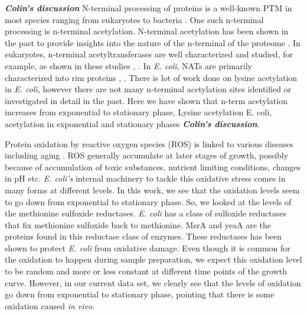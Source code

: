 \documentclass[12pt]{article}
\begin{document}
\textbf{\emph{Colin's discussion}} N-terminal processing of proteins is a well-known PTM in most species ranging from eukaryotes to bacteria \cite{Kimuraetal2003}. One such n-terminal processing is n-terminal acetylation. N-terminal acetylation has been shown in the past to provide insights into the nature of the n-terminal of the proteome \cite{Helbigetal2010}. In eukaryotes, n-terminal acetyltransferases are well characterized and studied, for example, as shown in these studies \cite{PolevodaSherman2003}, \cite{PolevodaSherman2003b}. In \emph{E. coli}, NATs are primarily characterized into rim proteins \cite{Tanakaetal1989}, \cite{Yoshikawaetal1987}. There is lot of work done on lysine acetylation in \emph{E. coli}, however there are not many n-terminal acetylation sites identified or investigated in detail in the past. Here we have shown that n-term acetylation increases from exponential to stationary phase, Lysine acetylation E. coli, acetylation in exponential and stationary phases \textbf{\emph{Colin's discussion}}. 

Protein oxidation by reactive oxygen species (ROS) is linked to various diseases including aging \cite{Stadtman1992}. ROS generally accumulate at later stages of growth, possibly because of accumulation of toxic substances, nutrient limiting conditions, changes in pH etc. \emph{E. coli's} internal machinery to tackle this oxidative stress comes in many forms at different levels. In this work, we see that the oxidation levels seem to go down from exponential to stationary phase. So, we looked at the levels of the methionine sulfoxide reductases. \emph{E. coli} has a class of sulfoxide reductases \cite{Brotetal1981} \cite{ZhangWeissbach2008} that fix methionine sulfoxide back to methionine. MsrA and yeaA are the proteins found in this reductase class of enzymes. These reductases has been shown to protect \emph{E. coli} from oxidative damage\cite{Ezratyetal2004}.  Even though it is common for the oxidation to happen during sample preparation, we expect this oxidation level to be random and more or less constant at different time points of the growth curve. However, in our current data set, we clearly see that the levels of oxidation go down from exponential to stationary phase, pointing that there is some oxidation caused \emph{in vivo}.

\end{document}
